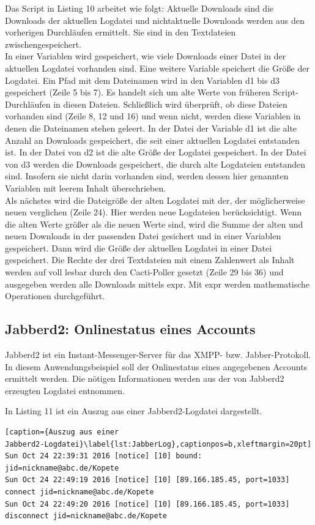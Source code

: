 \documentclass[12pt,ngerman,toc=listofnumbered,toc=bibliographynumbered,toc=index,headsepline=true]{scrbook}
\begin{document}
Das Script in Listing 10 arbeitet wie folgt: Aktuelle Downloads sind die
Downloads der aktuellen Logdatei und nichtaktuelle Downloads werden aus den
vorherigen Durchläufen ermittelt. Sie sind in den Textdateien
zwischengespeichert.\\
In einer Variablen wird gespeichert, wie viele Downloads einer Datei in der
aktuellen Logdatei vorhanden sind. Eine weitere Variable speichert die Größe der
Logdatei. Ein Pfad mit dem Dateinamen wird in den Variablen d1 bis d3
gespeichert (Zeile 5 bis 7). Es handelt sich um alte Werte von früheren
Script-Durchläufen in diesen Dateien. Schließlich wird überprüft, ob diese
Dateien vorhanden sind (Zeile 8, 12 und 16) und wenn nicht, werden diese
Variablen in denen die Dateinamen stehen geleert. In der Datei der Variable d1
ist die alte Anzahl an Downloads gespeichert, die seit einer aktuellen Logdatei
entstanden ist. In der Datei von d2 ist die alte Größe der Logdatei gespeichert.
In der Datei von d3 werden die Downloads gespeichert, die durch alte Logdateien
entstanden sind. Insofern sie nicht darin vorhanden sind, werden dessen hier
genannten Variablen mit leerem Inhalt überschrieben.\\
Als nächstes wird die Dateigröße der alten Logdatei mit der, der möglicherweise
neuen verglichen (Zeile 24). Hier werden neue Logdateien berücksichtigt.
Wenn die alten Werte größer als die neuen Werte sind, wird die Summe der alten
und neuen Downloads in der passenden Datei gesichert und in einer Variablen
gespeichert. Dann wird die Größe der aktuellen Logdatei in einer Datei
gespeichert. Die Rechte der drei Textdateien mit einem Zahlenwert als Inhalt
werden auf voll lesbar durch den Cacti-Poller gesetzt (Zeile 29 bis 36) und
ausgegeben werden alle Downloads mittels expr. Mit expr werden mathematische
Operationen durchgeführt.

\subsection{Jabberd2: Onlinestatus eines Accounts}
Jabberd2 ist ein Instant-Messenger-Server für das XMPP- bzw.
Jabber-Pro\-to\-koll. In diesem Anwendungsbeispiel soll der Onlinestatus eines
angegebenen Accounts ermittelt werden. Die nötigen Informationen werden aus der
von Jabberd2 erzeugten Logdatei entnommen.

In Listing 11 ist ein Auszug aus einer Jabberd2-Logdatei
dargestellt.

\begin{lstlisting}[caption={Auszug aus einer
Jabberd2-Logdatei}\label{lst:JabberLog},captionpos=b,xleftmargin=20pt]
Sun Oct 24 22:39:31 2016 [notice] [10] bound: jid=nickname@abc.de/Kopete 
Sun Oct 24 22:49:19 2016 [notice] [10] [89.166.185.45, port=1033] connect jid=nickname@abc.de/Kopete 
Sun Oct 24 22:49:20 2016 [notice] [10] [89.166.185.45, port=1033] disconnect jid=nickname@abc.de/Kopete 
\end{lstlisting}
\end{document}
